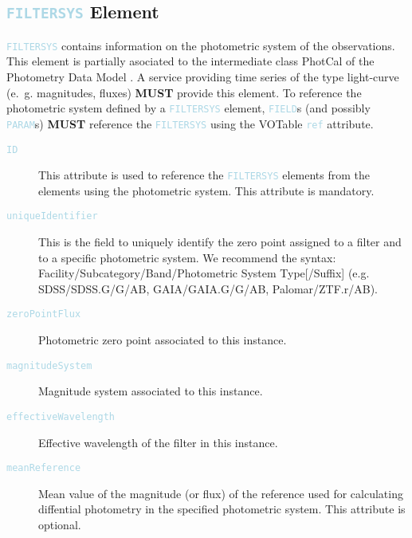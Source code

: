 \documentclass[11pt,a4paper]{ivoa}
\newcommand\elem[1]{\textcolor{LightBlue}{{\tt#1}}}
\begin{document}
\subsection{\elem{FILTERSYS} Element}
\elem{FILTERSYS} contains information on the photometric system of the observations. This element is partially asociated to the intermediate class PhotCal of the Photometry Data Model \cite{PhotometryDM}. A service providing time series of the type light-curve (e.~g. magnitudes, fluxes) \textbf{MUST} provide this element. To reference the photometric system defined by a \elem{FILTERSYS} element, \elem{FIELD}s (and possibly \elem{PARAM}s) \textbf{MUST} reference the \elem{FILTERSYS} using the VOTable \elem{ref} attribute. 
\begin{description}
     \item[\elem{ID}] This attribute is used to reference the \elem{FILTERSYS} elements from the elements using the photometric system. This attribute is mandatory. 
     \item[\elem{uniqueIdentifier}] This is the field to uniquely identify the zero point assigned to a filter and to a specific photometric system. We recommend the syntax: Facility/Subcategory/Band/Photometric System Type[/Suffix] (e.g. SDSS/SDSS.G/G/AB, GAIA/GAIA.G/G/AB, Palomar/ZTF.r/AB). 
     \item[\elem{zeroPointFlux}] Photometric zero point associated to this instance. 
     \item[\elem{magnitudeSystem}] Magnitude system associated to this instance.
     \item[\elem{effectiveWavelength}] Effective wavelength of the filter in this instance. 
     \item[\elem{meanReference}] Mean value of the magnitude (or flux) of the reference used for calculating diffential photometry in the specified photometric system. This attribute is optional.  
\end{description}
\end{document}
